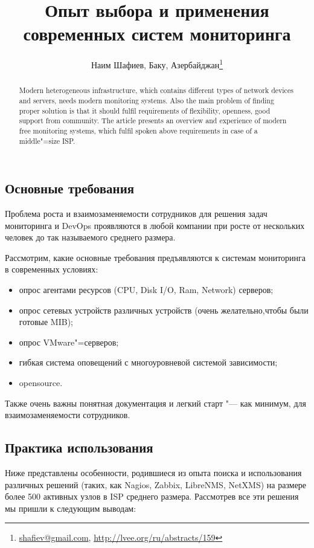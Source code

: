 \documentclass[10pt, a5paper]{article}
\begin{document}
\title{Опыт выбора и применения современных систем мониторинга}
\author{Наим Шафиев, Баку, Азербайджан\footnote{\url{shafiev@gmail.com}, \url{http://lvee.org/ru/abstracts/159}}}
\maketitle
\begin{abstract}
Modern heterogeneous infrastructure, which contains different types of network devices and servers, needs modern monitoring systems. Also the main problem of finding proper solution is that it should  fulfil requirements of flexibility, openness, good support from community. 
The article presents an overview and experience  of modern free monitoring systems, which fulfil spoken above requirements in case of a middle"=size ISP.
\end{abstract}
\subsection*{Основные требования}

Проблема роста и взаимозаменяемости сотрудников для решения задач мониторинга и DevOps проявляются в любой компании при росте от нескольких человек до так называемого среднего размера.

Рассмотрим, какие основные требования предъявляются к системам мониторинга в современных условиях:

\begin{itemize}
  \item опрос агентами ресурсов (CPU, Disk I/O, Ram, Network) серверов;
  \item опрос сетевых устройств различных устройств (очень желательно,чтобы были готовые MIB);
  \item опрос VMware"=серверов;
  \item гибкая система оповещений с многоуровневой системой зависимости;
  \item opensource.
\end{itemize}

Также очень важны понятная документация и легкий старт "--- как минимум, для взаимозаменяемости сотрудников.

\subsection*{Практика использования}

Ниже представлены особенности, родившиеся из опыта поиска и использования различных решений (таких, как Nagios, Zabbix, LibreNMS, NetXMS) на  размере более 500 активных узлов в ISP среднего размера.
Рассмотрев все эти решения мы пришли к следующим выводам:
\end{document}
